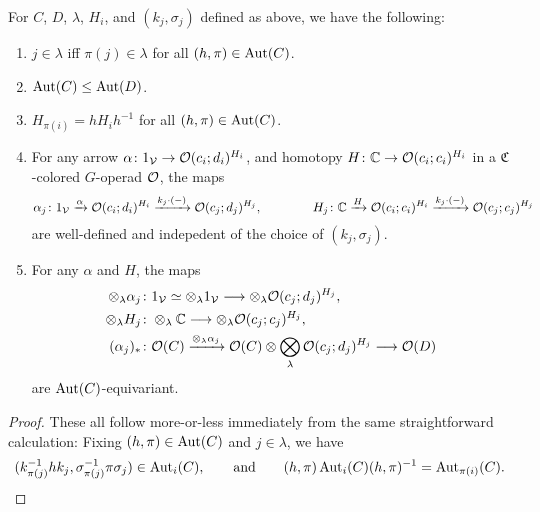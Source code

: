 \documentclass[a4paper,10pt
,draft
]{article}%
\renewcommand{\1}{\eta}%
\begin{document}
\begin{lemma}
      \label{AUTC_LEM}
      For $C$, $D$, $\lambda$, $H_i$, and $(k_j, \sigma_j)$ defined as above, we have the following:
      \begin{enumerate}[label = (\roman*)]
      \item $j \in \lambda$ iff $\pi(j) \in \lambda$ for all $(h,\pi) \in \operatorname{Aut}(C)$.
      \item $\operatorname{Aut}(C) \leq \operatorname{Aut}(D)$.
      \item $H_{\pi(i)} = h H_i h^{-1}$ for all $(h,\pi) \in \operatorname{Aut}(C)$.
      \item For any arrow
            $\alpha \colon 1_{\mathcal V} \to \mathcal{O}(c_i;d_i)^{H_i}$,
            and homotopy
            $H \colon \mathbb C \to \mathcal{O}(c_i;c_i)^{H_i}$
            in a $\mathfrak C$-colored $G$-operad $\mathcal{O}$,
            the maps
            \begin{equation}
                  \alpha_j \colon 1_{\mathcal V} \xrightarrow{\alpha} \mathcal{O}(c_i; d_i)^{H_i} \xrightarrow{ k_j \cdot (-) } \mathcal{O}(c_j; d_j)^{H_j},
                  \qquad \qquad
                  H_j \colon \mathbb C \xrightarrow{H} \mathcal{O}(c_i;c_i)^{H_i} \xrightarrow{k_j \cdot (-)} \mathcal{O}(c_j;c_j)^{H_j}
            \end{equation}
            are well-defined and indepedent of the choice of $(k_j, \sigma_j)$.
      \item For any $\alpha$ and $H$, the maps
            \begin{align*}
              \otimes_\lambda \alpha_j \colon & 1_\V \simeq \otimes_\lambda 1_\V \longto \otimes_\lambda \O(c_j; d_j)^{H_j},
              \\
              \otimes_\lambda H_j \colon & \otimes_\lambda \mathbb C \longto \otimes_\lambda \O(c_j;c_j)^{H_j},
              \\
              (\alpha_j)_{\**} \colon & \O(C) \xrightarrow{\otimes_\lambda \alpha_j} \O(C) \otimes \bigotimes_\lambda \O(c_j; d_j)^{H_j} \longto \O(D)
            \end{align*}
            are $\operatorname{Aut}(C)$-equivariant.
      \end{enumerate}
\end{lemma}
\begin{proof}
      These all follow more-or-less immediately from the same straightforward calculation:
      Fixing $(h,\pi) \in \operatorname{Aut}(C)$ and $j \in \lambda$, we have
      \begin{equation}
            (k_{\pi(j)}^{-1} h k_j, \sigma_{\pi(j)}^{-1} \pi \sigma_j) \in \operatorname{Aut}_i(C),
            \qquad
            \textrm{and}
            \qquad
            (h,\pi) \operatorname{Aut}_i(C) (h,\pi)^{-1} = \operatorname{Aut}_{\pi(i)}(C).
      \end{equation}
\end{proof}
\end{document}
